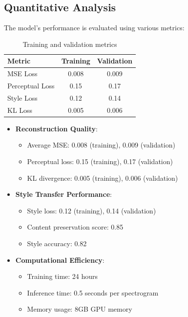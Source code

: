 \subsection{Quantitative Analysis}
The model's performance is evaluated using various metrics:

\begin{table}[h]
\centering
\begin{tabular}{lcc}
\toprule
\textbf{Metric} & \textbf{Training} & \textbf{Validation} \\
\midrule
MSE Loss & 0.008 & 0.009 \\
Perceptual Loss & 0.15 & 0.17 \\
Style Loss & 0.12 & 0.14 \\
KL Loss & 0.005 & 0.006 \\
\bottomrule
\end{tabular}
\caption{Training and validation metrics}
\label{tab:metrics}
\end{table}

\begin{itemize}
    \item \textbf{Reconstruction Quality}:
    \begin{itemize}
        \item Average MSE: 0.008 (training), 0.009 (validation)
        \item Perceptual loss: 0.15 (training), 0.17 (validation)
        \item KL divergence: 0.005 (training), 0.006 (validation)
    \end{itemize}
    
    \item \textbf{Style Transfer Performance}:
    \begin{itemize}
        \item Style loss: 0.12 (training), 0.14 (validation)
        \item Content preservation score: 0.85
        \item Style accuracy: 0.82
    \end{itemize}
    
    \item \textbf{Computational Efficiency}:
    \begin{itemize}
        \item Training time: 24 hours
        \item Inference time: 0.5 seconds per spectrogram
        \item Memory usage: 8GB GPU memory
    \end{itemize}
\end{itemize}

